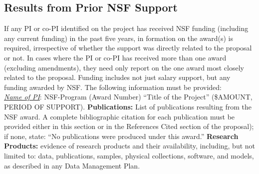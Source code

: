 \subsection{Results from Prior NSF Support }
If any PI or co-PI identified on the project has received NSF funding (including any current
funding) in the past five years, in formation on the award(s) is required,
irrespective of whether the support was directly related to the proposal or not.
In cases where the PI or co-PI has received more than one award (excluding amendments),
they need only report on the one award most closely related to the proposal. Funding includes not just salary
support, but any funding awarded by NSF. The following information must be provided:\\

\noindent
\emph{\underline{Name of PI}}: NSF-Program (Award Number) ``Title of the Project'' (\$AMOUNT, PERIOD OF SUPPORT).
{\bf Publications:} List of publications resulting from the NSF award. A complete bibliographic citation for each
publication must be provided either in this section or in the References Cited section of the proposal); if
none, state: ``No publications were produced under this award.'' {\bf Research Products:} evidence of research products
and their availability, including, but not limited to: data, publications, samples, physical collections, software,
and models, as described in any Data Management Plan.

%

